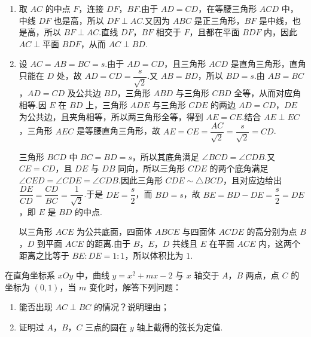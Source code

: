 \begin{solution}
\begin{enumerate}
\item 取 \(AC\) 的中点 \(F\)，连接 \(DF\)，\(BF\).由于 \(AD=CD\)，在等腰三角形 \(ACD\) 中，中线 \(DF\) 也是高，所以 \(DF\perp AC\).又因为 \(ABC\) 是正三角形，\(BF\) 是中线，也是高，所以 \(BF\perp AC\).直线 \(DF\)，\(BF\) 相交于 \(F\)，且都在平面 \(BDF\) 内，因此 \(AC\perp\text{平面 }BDF\)，从而 \(AC\perp BD\).
\item 设 \(AC=AB=BC=s\).由于 \(AD=CD\)，且三角形 \(ACD\) 是直角三角形，直角只能在 \(D\) 处，故
\(AD=CD=\dfrac{s}{\sqrt2}\).又 \(AB=BD\)，所以 \(BD=s\).由 \(AB=BC\)，\(AD=CD\) 及公共边 \(BD\)，三角形 \(ABD\) 与三角形 \(CBD\) 全等，从而对应角相等.因 \(E\) 在 \(BD\) 上，三角形 \(ADE\) 与三角形 \(CDE\) 的两边 \(AD=CD\)，\(DE\) 为公共边，且夹角相等，所以两三角形全等，得到 \(AE=CE\).结合 \(AE\perp EC\)，三角形 \(AEC\) 是等腰直角三角形，故
\(AE=CE=\dfrac{AC}{\sqrt2}=\dfrac{s}{\sqrt2}=CD\).

三角形 \(BCD\) 中 \(BC=BD=s\)，所以其底角满足 \(\angle BCD=\angle CDB\).又 \(CE=CD\)，且 \(DE\) 与 \(DB\) 同向，所以三角形 \(CDE\) 的两个底角满足 \(\angle CED=\angle CDE=\angle CDB\).因此三角形 \(CDE\sim\triangle BCD\)，且对应边给出
\(\dfrac{DE}{CD}=\dfrac{CD}{BC}=\dfrac{1}{\sqrt2}\).于是 \(DE=\dfrac{s}{2}\)，而 \(BD=s\)，故 \(BE=BD-DE=\dfrac{s}{2}=DE\)，即 \(E\) 是 \(BD\) 的中点.

以三角形 \(ACE\) 为公共底面，四面体 \(ABCE\) 与四面体 \(ACDE\) 的高分别为点 \(B\)，\(D\) 到平面 \(ACE\) 的距离.由于 \(B\)，\(E\)，\(D\) 共线且 \(E\) 在平面 \(ACE\) 内，这两个距离之比等于 \(BE:DE=1:1\)，所以体积比为 \(1\).
\end{enumerate}
\end{solution}

\begin{problem}
在直角坐标系 \(xOy\) 中，曲线 \(y=x^2+mx-2\) 与 \(x\) 轴交于 \(A\)，\(B\) 两点，点 \(C\) 的坐标为 \((0,1)\)，当 \(m\) 变化时，解答下列问题：

\begin{enumerate}
\item 能否出现 \(AC\perp BC\) 的情况？说明理由；
\item 证明过 \(A\)，\(B\)，\(C\) 三点的圆在 \(y\) 轴上截得的弦长为定值.
\end{enumerate}
\end{problem}


